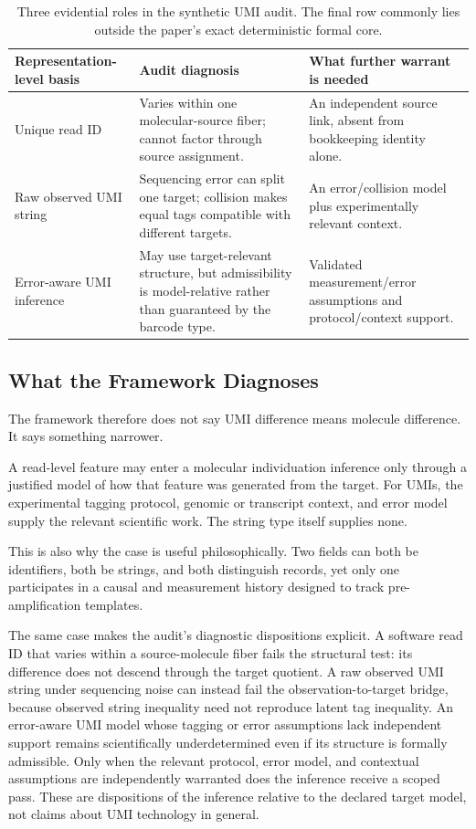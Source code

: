 \documentclass[12pt]{article}
\begin{document}
\begin{table}[ht]
\centering
\begin{tabularx}{\textwidth}{@{}l >{\raggedright\arraybackslash}X >{\raggedright\arraybackslash}X@{}}
\toprule
\textbf{Representation-level basis} & \textbf{Audit diagnosis} & \textbf{What further warrant is needed} \\
\midrule
Unique read ID & Varies within one molecular-source fiber; cannot factor through source assignment. & An independent source link, absent from bookkeeping identity alone. \\
Raw observed UMI string & Sequencing error can split one target; collision makes equal tags compatible with different targets. & An error/collision model plus experimentally relevant context. \\
Error-aware UMI inference & May use target-relevant structure, but admissibility is model-relative rather than guaranteed by the barcode type. & Validated measurement/error assumptions and protocol/context support. \\
\bottomrule
\end{tabularx}
\caption{Three evidential roles in the synthetic UMI audit. The final row commonly lies outside the paper's exact deterministic formal core.}
\label{tab:umi-audit}
\end{table}

\subsection{What the Framework Diagnoses}

The framework therefore does not say UMI difference means molecule difference. It says something narrower.

A read-level feature may enter a molecular individuation inference only through a justified model of how that feature was generated from the target. For UMIs, the experimental tagging protocol, genomic or transcript context, and error model supply the relevant scientific work. The string type itself supplies none.

This is also why the case is useful philosophically. Two fields can both be identifiers, both be strings, and both distinguish records, yet only one participates in a causal and measurement history designed to track pre-amplification templates.

The same case makes the audit's diagnostic dispositions explicit. A software read ID that varies within a source-molecule fiber fails the structural test: its difference does not descend through the target quotient. A raw observed UMI string under sequencing noise can instead fail the observation-to-target bridge, because observed string inequality need not reproduce latent tag inequality. An error-aware UMI model whose tagging or error assumptions lack independent support remains scientifically underdetermined even if its structure is formally admissible. Only when the relevant protocol, error model, and contextual assumptions are independently warranted does the inference receive a scoped pass. These are dispositions of the inference relative to the declared target model, not claims about UMI technology in general.
\end{document}
